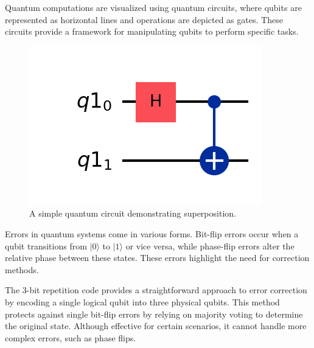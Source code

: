\documentclass[10pt]{article}
\begin{document}
\begin{multicols}{2}
    Quantum computations are visualized using quantum circuits, where qubits are represented as horizontal lines and operations are depicted as gates. These circuits provide a framework for manipulating qubits to perform specific tasks.\cite{bernhardt}
    \begin{figure}[H]
        \centering
        \includegraphics[width=0.8\columnwidth]{figures/qc.png}
        \caption{A simple quantum circuit demonstrating superposition.}
        \label{fig:bell_circuit}
    \end{figure}
    
    Errors in quantum systems come in various forms. Bit-flip errors occur when a qubit transitions from \( |0\rangle \) to \( |1\rangle \) or vice versa, while phase-flip errors alter the relative phase between these states. These errors highlight the need for correction methods.
    
    The 3-bit repetition code provides a straightforward approach to error correction by encoding a single logical qubit into three physical qubits. This method protects against single bit-flip errors by relying on majority voting to determine the original state. Although effective for certain scenarios, it cannot handle more complex errors, such as phase flips.
    

\end{multicols}
\end{document}

